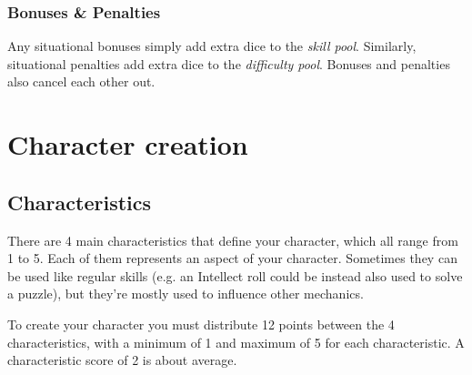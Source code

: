 \subsection{Bonuses \& Penalties}
Any situational bonuses simply add extra dice to the \textit{skill pool}. 
Similarly, situational penalties add extra dice to the \textit{difficulty pool}. 
Bonuses and penalties also cancel each other out. 


\chapter{Character creation}

\section{Characteristics} \label{characteristics}


There are 4 main characteristics that define your character, which all range from 1 to 5. 
Each of them represents an aspect of your character. Sometimes they can be used like regular skills (e.g. an Intellect roll could be  instead also used to solve a puzzle), 
but they're mostly used to influence other mechanics. 

To create your character you must distribute 12 points between the 4 characteristics, 
with a minimum of 1 and maximum of 5 for each characteristic.
A characteristic score of 2 is about average.



